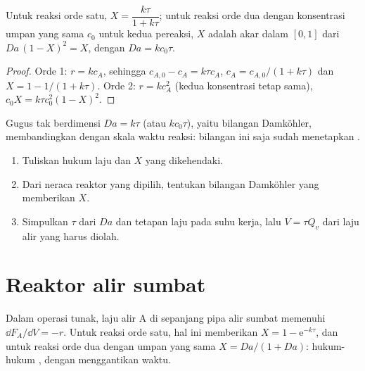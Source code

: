 \begin{theorem}\label{thm:b2:continuous-reactors:cstr}
Untuk reaksi orde satu, $X = \dfrac{k\tau}{1 + k\tau}$; untuk reaksi orde
dua dengan konsentrasi umpan yang sama $c_0$ untuk kedua pereaksi, $X$
adalah akar dalam $[0, 1]$ dari $Da\,(1 - X)^2 = X$, dengan
$Da =
kc_0\tau$.
\end{theorem}

\begin{proof}
Orde 1: $r = kc_A$, sehingga $c_{A,0} - c_A = k\tau c_A$,
$c_A = c_{A,0}/(1 + k\tau)$ dan $X = 1 - 1/(1 + k\tau)$. Orde 2:
$r = kc_A^2$ (kedua konsentrasi tetap sama),
$c_0X = k\tau c_0^2(1 - X)^2$.
\end{proof}

Gugus tak berdimensi $Da = k\tau$ (atau $kc_0\tau$), yaitu bilangan
Damköhler, membandingkan  dengan skala waktu reaksi:
bilangan ini saja sudah menetapkan .

\begin{method}\label{met:b2:continuous-reactors:size-reactor}
\begin{enumerate}
  \item Tuliskan hukum laju dan  $X$ yang dikehendaki.
  \item Dari neraca reaktor yang dipilih, tentukan bilangan Damköhler yang
        memberikan $X$.
  \item Simpulkan $\tau$ dari $Da$ dan tetapan laju pada suhu kerja, lalu
        $V = \tau Q_v$ dari laju alir yang harus diolah.
\end{enumerate}
\end{method}

\section{Reaktor alir sumbat}

\begin{theorem}\label{thm:b2:continuous-reactors:pfr}
Dalam operasi tunak, laju alir A di sepanjang pipa alir sumbat memenuhi
$\dd F_A/\dd V = -r$. Untuk reaksi orde satu, hal ini memberikan
$X = 1 -
\mathrm e^{-k\tau}$, dan untuk reaksi orde dua dengan umpan yang
sama $X =
Da/(1 + Da)$: hukum-hukum , dengan 
menggantikan waktu.
\end{theorem}

